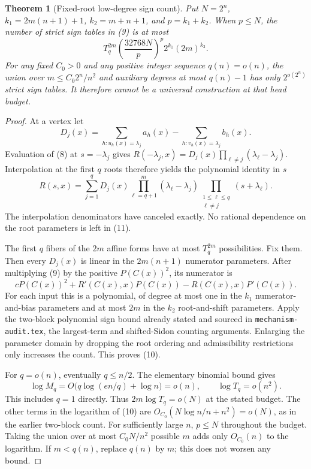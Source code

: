 \documentclass[11pt]{article}
\newtheorem{theorem}{Theorem}
\begin{document}
\begin{theorem}[Fixed-root low-degree sign count]
Put $N=2^n$, $k_1=2m(n+1)+1$, $k_2=m+n+1$, and $p=k_1+k_2$.
When $p\le N$, the number of strict sign tables in (9) is at most
\[
 T_q^{2m}\left(\frac{32768N}{p}\right)^p
                  2^{k_1}(2m)^{k_2}.
 \tag{10}
\]
For any fixed $C_0>0$ and any positive integer sequence $q(n)=o(n)$, the union
over $m\le C_0 2^n/n^2$ and auxiliary degrees at most $q(n)-1$
has only $2^{o(2^n)}$ strict sign tables. It therefore cannot be a
universal construction at that head budget.
\end{theorem}
\begin{proof}
At a vertex let
\[
 D_j(x)=\sum_{h:u_h(x)=\lambda_j}a_h(x)
                   -\sum_{h:v_h(x)=\lambda_j}b_h(x).
\]
Evaluation of (8) at $s=-\lambda_j$ gives
$R(-\lambda_j,x)=D_j(x)\prod_{\ell\ne j}(\lambda_\ell-\lambda_j)$.
Interpolation at the first $q$ roots therefore yields the polynomial
identity in $s$
\[
 R(s,x)=\sum_{j=1}^q D_j(x)
       \prod_{\ell=q+1}^m(\lambda_\ell-\lambda_j)
       \prod_{\substack{1\le\ell\le q\\\ell\ne j}}(s+\lambda_\ell).
 \tag{11}
\]
The interpolation denominators have canceled exactly. No rational
dependence on the root parameters is left in (11).

The first $q$ fibers of the $2m$ affine forms have at most $T_q^{2m}$
possibilities. Fix them. Then every $D_j(x)$ is linear in the
$2m(n+1)$ numerator parameters. After multiplying (9) by the positive
$P(C(x))^2$, its numerator is
\[
       cP(C(x))^2+R'(C(x),x)P(C(x))-R(C(x),x)P'(C(x)).
\]
For each input this is a polynomial, of degree at most one in the
$k_1$ numerator-and-bias parameters and at most $2m$ in the $k_2$
root-and-shift parameters. Apply the two-block polynomial sign bound
already stated and sourced in \texttt{mechanism-audit.tex}, the
largest-term and shifted-Sidon counting arguments. Enlarging the
parameter domain by dropping the root ordering and admissibility
restrictions only increases the count. This proves (10).

For $q=o(n)$, eventually $q\le n/2$. The elementary binomial bound
gives
\[
 \log M_q=O\bigl(q\log(en/q)+\log n\bigr)=o(n),
 \qquad \log T_q=o(n^2).
\]
This includes $q=1$ directly. Thus $2m\log T_q=o(N)$ at the
stated budget. The other terms in the logarithm of (10) are
$O_{C_0}(N\log n/n+n^2)=o(N)$, as in the earlier two-block count.
For sufficiently large $n$, $p\le N$ throughout the budget.
Taking the union over at most $C_0N/n^2$ possible $m$ adds only
$O_{C_0}(n)$ to the logarithm. If $m<q(n)$, replace $q(n)$ by $m$;
this does not worsen any bound.
\end{proof}
\end{document}
